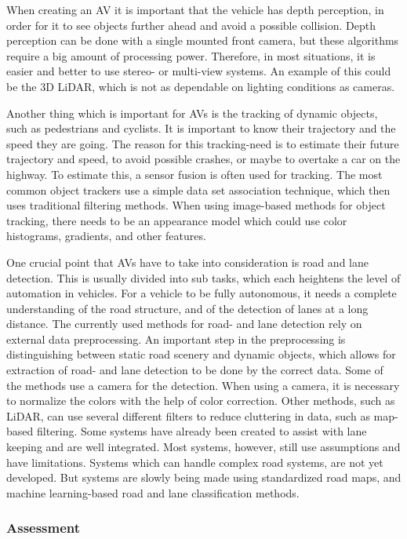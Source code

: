 When creating an AV it is important that the vehicle has depth perception, in order for it to see objects further ahead and avoid a possible collision.
Depth perception can be done with a single mounted front camera, but these algorithms require a big amount of processing power.
Therefore, in most situations, it is easier and better to use stereo- or multi-view systems.
An example of this could be the 3D LiDAR, which is not as dependable on lighting conditions as cameras.

Another thing which is important for AVs is the tracking of dynamic objects, such as pedestrians and cyclists.
It is important to know their trajectory and the speed they are going.
The reason for this tracking-need is to estimate their future trajectory and speed, to avoid possible crashes, or maybe to overtake a car on the highway.
To estimate this, a sensor fusion is often used for tracking.
The most common object trackers use a simple data set association technique, which then uses traditional filtering methods.
When using image-based methods for object tracking, there needs to be an appearance model which could use color histograms, gradients, and other features.

One crucial point that AVs have to take into consideration is road and lane detection.
This is usually divided into sub tasks, which each heightens the level of automation in vehicles.
For a vehicle to be fully autonomous, it needs a complete understanding of the road structure, and of the detection of lanes at a long distance.
The currently used methods for road- and lane detection rely on external data preprocessing.
An important step in the preprocessing is distinguishing between static road scenery and dynamic objects, which allows for extraction of road- and lane detection to be done by the correct data.
Some of the methods use a camera for the detection.
When using a camera, it is necessary to normalize the colors with the help of color correction.
Other methods, such as LiDAR, can use several different filters to reduce cluttering in data, such as map-based filtering.
Some systems have already been created to assist with lane keeping and are well integrated.
Most systems, however, still use assumptions and have limitations.
Systems which can handle complex road systems, are not yet developed.
But systems are slowly being made using standardized road maps, and machine learning-based road and lane classification methods.

\subsubsection{Assessment}

